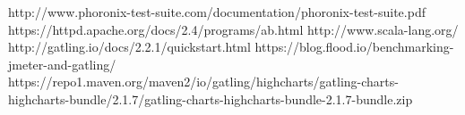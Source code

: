 


\newpage

\begin{thebibliography}{xx}
	 http://www.phoronix-test-suite.com/documentation/phoronix-test-suite.pdf
	 https://httpd.apache.org/docs/2.4/programs/ab.html
	 http://www.scala-lang.org/
	 http://gatling.io/docs/2.2.1/quickstart.html
	 https://blog.flood.io/benchmarking-jmeter-and-gatling/
	https://repo1.maven.org/maven2/io/gatling/highcharts/gatling-charts-highcharts-bundle/2.1.7/gatling-charts-highcharts-bundle-2.1.7-bundle.zip
	
\end{thebibliography}
